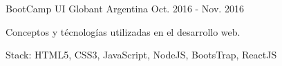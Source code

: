 \begin{cventries}
\cventry
{BootCamp UI} %
{Globant} %
{Argentina} %
{Oct. 2016 - Nov. 2016} %
{ %
\begin{cvitems}
\item {Conceptos y técnologías utilizadas en el desarrollo web.}
\item {Stack: HTML5, CSS3, JavaScript, NodeJS, BootsTrap, ReactJS}
\end{cvitems}
}
\end{cventries}
